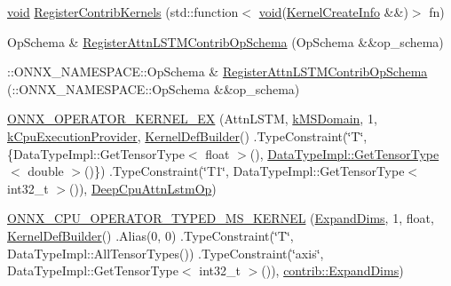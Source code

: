 \begin{DoxyCompactItemize}
\item 
\mbox{\hyperlink{mlasi_8h_a88f941d423cb2a819b70a1358982b1a6}{void}} \mbox{\hyperlink{namespaceonnxruntime_1_1contrib_a4b729f666760ab53d11c9597b1c9ee4b}{Register\+Contrib\+Kernels}} (std\+::function$<$ \mbox{\hyperlink{mlasi_8h_a88f941d423cb2a819b70a1358982b1a6}{void}}(\mbox{\hyperlink{structonnxruntime_1_1KernelCreateInfo}{Kernel\+Create\+Info}} \&\&)$>$ fn)
\item 
Op\+Schema \& \mbox{\hyperlink{namespaceonnxruntime_1_1contrib_a8911f35756d77a3dcbcfe7318ab90fee}{Register\+Attn\+L\+S\+T\+M\+Contrib\+Op\+Schema}} (Op\+Schema \&\&op\+\_\+schema)
\item 
\+::O\+N\+N\+X\+\_\+\+N\+A\+M\+E\+S\+P\+A\+C\+E\+::\+Op\+Schema \& \mbox{\hyperlink{namespaceonnxruntime_1_1contrib_ab7b2c79feb8ae6d92ec8f8decb006d11}{Register\+Attn\+L\+S\+T\+M\+Contrib\+Op\+Schema}} (\+::O\+N\+N\+X\+\_\+\+N\+A\+M\+E\+S\+P\+A\+C\+E\+::\+Op\+Schema \&\&op\+\_\+schema)
\item 
\mbox{\hyperlink{namespaceonnxruntime_1_1contrib_a3a0c927922725b88d8918e87a47ff48b}{O\+N\+N\+X\+\_\+\+O\+P\+E\+R\+A\+T\+O\+R\+\_\+\+K\+E\+R\+N\+E\+L\+\_\+\+EX}} (Attn\+L\+S\+TM, \mbox{\hyperlink{namespaceonnxruntime_a1e63b08774e23395d961e8e35fb62db1}{k\+M\+S\+Domain}}, 1, \mbox{\hyperlink{namespaceonnxruntime_a394a3c7e50622de1f203a96df592060d}{k\+Cpu\+Execution\+Provider}}, \mbox{\hyperlink{classonnxruntime_1_1KernelDefBuilder}{Kernel\+Def\+Builder}}() .Type\+Constraint(\char`\"{}T\char`\"{}, \{Data\+Type\+Impl\+::\+Get\+Tensor\+Type$<$ float $>$(), \mbox{\hyperlink{classonnxruntime_1_1DataTypeImpl_a7c4a6a7126bc7661eb67af6dfcfad1fb}{Data\+Type\+Impl\+::\+Get\+Tensor\+Type}}$<$ double $>$()\}) .Type\+Constraint(\char`\"{}T1\char`\"{}, Data\+Type\+Impl\+::\+Get\+Tensor\+Type$<$ int32\+\_\+t $>$()), \mbox{\hyperlink{classonnxruntime_1_1contrib_1_1DeepCpuAttnLstmOp}{Deep\+Cpu\+Attn\+Lstm\+Op}})
\item 
\mbox{\hyperlink{namespaceonnxruntime_1_1contrib_a4c710f36b8f51ef0af8394607ea6af21}{O\+N\+N\+X\+\_\+\+C\+P\+U\+\_\+\+O\+P\+E\+R\+A\+T\+O\+R\+\_\+\+T\+Y\+P\+E\+D\+\_\+\+M\+S\+\_\+\+K\+E\+R\+N\+EL}} (\mbox{\hyperlink{classonnxruntime_1_1contrib_1_1ExpandDims}{Expand\+Dims}}, 1, float, \mbox{\hyperlink{classonnxruntime_1_1KernelDefBuilder}{Kernel\+Def\+Builder}}() .Alias(0, 0) .Type\+Constraint(\char`\"{}T\char`\"{}, Data\+Type\+Impl\+::\+All\+Tensor\+Types()) .Type\+Constraint(\char`\"{}axis\char`\"{}, Data\+Type\+Impl\+::\+Get\+Tensor\+Type$<$ int32\+\_\+t $>$()), \mbox{\hyperlink{classonnxruntime_1_1contrib_1_1ExpandDims}{contrib\+::\+Expand\+Dims}})

\end{DoxyCompactItemize}
